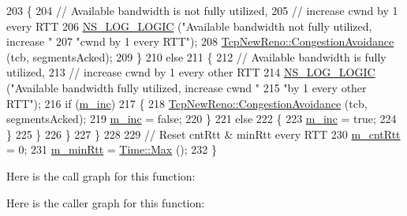\begin{DoxyCode}
203             \{
204               \textcolor{comment}{// Available bandwidth is not fully utilized,}
205               \textcolor{comment}{// increase cwnd by 1 every RTT}
206               \hyperlink{group__logging_ga88acd260151caf2db9c0fc84997f45ce}{NS\_LOG\_LOGIC} (\textcolor{stringliteral}{"Available bandwidth not fully utilized, increase "}
207                             \textcolor{stringliteral}{"cwnd by 1 every RTT"});
208               \hyperlink{classns3_1_1TcpNewReno_a34a5eec0649a7b485852c74c825e14ba}{TcpNewReno::CongestionAvoidance} (tcb, segmentsAcked);
209             \}
210           \textcolor{keywordflow}{else}
211             \{
212               \textcolor{comment}{// Available bandwidth is fully utilized,}
213               \textcolor{comment}{// increase cwnd by 1 every other RTT}
214               \hyperlink{group__logging_ga88acd260151caf2db9c0fc84997f45ce}{NS\_LOG\_LOGIC} (\textcolor{stringliteral}{"Available bandwidth fully utilized, increase cwnd "}
215                             \textcolor{stringliteral}{"by 1 every other RTT"});
216               \textcolor{keywordflow}{if} (\hyperlink{classns3_1_1TcpVeno_a0962710ab039eac65735fb61bbe850b2}{m\_inc})
217                 \{
218                   \hyperlink{classns3_1_1TcpNewReno_a34a5eec0649a7b485852c74c825e14ba}{TcpNewReno::CongestionAvoidance} (tcb, segmentsAcked);
219                   \hyperlink{classns3_1_1TcpVeno_a0962710ab039eac65735fb61bbe850b2}{m\_inc} = \textcolor{keyword}{false};
220                 \}
221               \textcolor{keywordflow}{else}
222                 \{
223                   \hyperlink{classns3_1_1TcpVeno_a0962710ab039eac65735fb61bbe850b2}{m\_inc} = \textcolor{keyword}{true};
224                 \}
225             \}
226         \}
227     \}
228 
229   \textcolor{comment}{// Reset cntRtt & minRtt every RTT}
230   \hyperlink{classns3_1_1TcpVeno_a56ba63c2e02200d19b808741c1f68c64}{m\_cntRtt} = 0;
231   \hyperlink{classns3_1_1TcpVeno_a9fd4b7308b7f0b7cd4179d6f65aba383}{m\_minRtt} = \hyperlink{classns3_1_1Time_ad3414eb47d40a34971d5e78db88cfc72}{Time::Max} ();
232 \}
\end{DoxyCode}


Here is the call graph for this function\+:




Here is the caller graph for this function\+:


